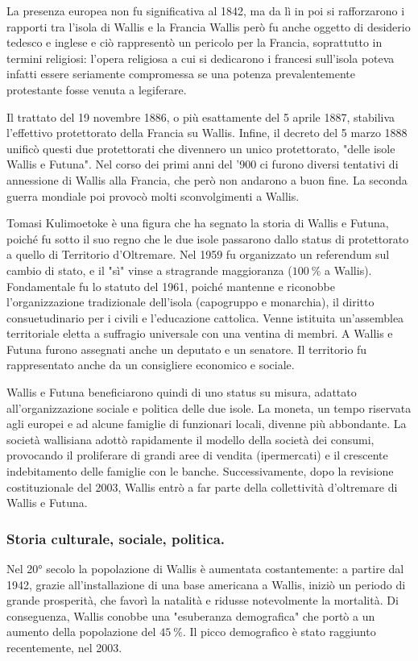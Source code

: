 \documentclass[fleqn,11pt]{SelfArx} %
\begin{document}
La presenza europea non fu significativa al 1842, ma da lì in poi si rafforzarono i rapporti tra l'isola di Wallis e la Francia
Wallis però fu anche oggetto di desiderio tedesco e inglese e ciò rappresentò un pericolo per la Francia, soprattutto in termini religiosi: l'opera religiosa a cui si dedicarono i francesi sull'isola poteva infatti essere seriamente compromessa se una potenza prevalentemente protestante fosse venuta a legiferare.

Il trattato del 19 novembre 1886, o più esattamente del 5 aprile 1887, stabiliva l'effettivo protettorato della Francia su Wallis.
Infine, il decreto del 5 marzo 1888 unificò questi due protettorati che divennero un unico protettorato, "delle isole Wallis e Futuna".
Nel corso dei primi anni del '900 ci furono diversi tentativi di annessione di Wallis alla Francia, che però non andarono a buon fine.
La seconda guerra mondiale poi provocò molti sconvolgimenti a Wallis.

Tomasi Kulimoetoke è una figura che ha segnato la storia di Wallis e Futuna, poiché fu sotto il suo regno che le due isole passarono dallo status di protettorato a quello di Territorio d'Oltremare.
Nel 1959 fu organizzato un referendum sul cambio di stato, e il "sì" vinse a stragrande maggioranza (\(\SI{100}{\percent}\) a Wallis).
Fondamentale fu lo statuto del 1961, poiché mantenne e riconobbe l'organizzazione tradizionale dell'isola (capogruppo e monarchia), il diritto consuetudinario per i civili e l'educazione cattolica.
Venne istituita un'assemblea territoriale eletta a suffragio universale con una ventina di membri.
A Wallis e Futuna furono assegnati anche un deputato e un senatore.
Il territorio fu rappresentato anche da un consigliere economico e sociale.

Wallis e Futuna beneficiarono quindi di uno status su misura, adattato all'organizzazione sociale e politica delle due isole.
La moneta, un tempo riservata agli europei e ad alcune famiglie di funzionari locali, divenne più abbondante.
La società wallisiana adottò rapidamente il modello della società dei consumi, provocando il proliferare di grandi aree di vendita (ipermercati) e il crescente indebitamento delle famiglie con le banche.
Successivamente, dopo la revisione costituzionale del 2003, Wallis entrò a far parte della collettività d'oltremare di Wallis e Futuna.

\subsubsection{Storia culturale, sociale, politica.}
Nel 20° secolo la popolazione di Wallis è aumentata costantemente: a partire dal 1942, grazie all'installazione di una base americana a Wallis, iniziò un periodo di grande prosperità, che favorì la natalità e ridusse notevolmente la mortalità.
Di conseguenza, Wallis conobbe una "esuberanza demografica" che portò a un aumento della popolazione del \(\SI{45}{\percent}\).
Il picco demografico è stato raggiunto recentemente, nel 2003.
\end{document}
